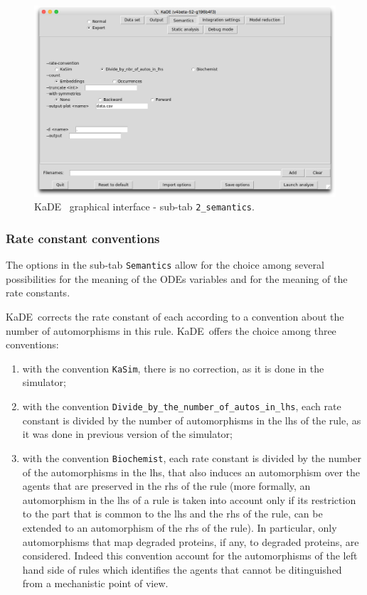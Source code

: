 \documentclass[11pt]{book}
\def\KaDE{\textsf{KaDE}}
\begin{document}
\begin{figure}[htbp]
\centering
\includegraphics[width=12cm,bb=0 0 1904 1208]{img/kade_2.png}
\caption{\KaDE~ graphical interface - sub-tab \texttt{2\_semantics}.}
\label{fig:kade:2}
\end{figure}

\subsubsection{Rate constant conventions}





The options in the sub-tab \texttt{Semantics} allow for the choice among several possibilities for the meaning of the ODEs variables and for the meaning of the rate constants.


 \KaDE~corrects the rate constant of each  according to a convention about the number of automorphisms in this rule. {\KaDE}~offers the choice among three conventions:
\begin{enumerate}
  \item with the convention \texttt{KaSim}, there is no correction, as it is done in the simulator;
  \item with the convention \texttt{Divide\_by\_the\_number\_of\_autos\_in\_lhs}, each rate constant is divided by the number of automorphisms in the lhs of the rule, as it was done in previous version of the simulator;
  \item  with the convention \texttt{Biochemist}, each rate constant is divided
  by the number of the automorphisms in the lhs, that also induces an automorphism over the agents that are preserved in the rhs of the rule (more formally, an automorphism in the lhs of a rule is taken into account only if its restriction to the part that is common to the lhs and the rhs of the rule, can be extended to an automorphism of the rhs of the rule). In particular, only automorphisms that  map degraded proteins, if any, to degraded proteins, are considered. Indeed this convention account for the automorphisms of the left hand side of rules which identifies the agents that cannot be ditinguished from a mechanistic point of view.
\end{enumerate}
\end{document}
